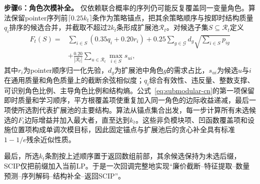 \documentclass[final,5p,times,twocolumn]{elsarticle}
\begin{document}
\noindent\textbf{步骤6：角色次模补全。} 仅依赖联合概率的序列仍可能反复覆盖同一变量角色。算法保留pointer序列前$\lceil0.25k_t\rceil$条作为策略锚点，把其余策略顺序与按即时结构质量$q_i$排序的候选合并，并截取不超过$2k_t$条形成扩展池$\mathcal R_t$。对候选子集$S\subseteq\mathcal R_t$定义
\begin{equation}
\begin{aligned}
F_t(S)={}&\sum_{i\in S}(0.35q_i+0.20r_i)
+0.25\sum_{g\in\mathcal G}d_g\sqrt{\sum_{i\in S}p_{ig}}\\
&+\frac{0.20}{|\mathcal R_t|}\sum_{u\in\mathcal R_t}\max_{i\in S}s_{ui},
\end{aligned}
\label{eq:submodular-cn}
\end{equation}
其中$r_i$为pointer顺序归一化先验，$d_g$为扩展池中角色$g$的需求占比，$s_{ui}$为候选$u$与$i$在通用质量和角色质量上的截断余弦相似度；$q_i$综合有效性、违反量、整数支撑、可识别角色比例、主导角色比例和结构熵。公式~\eqref{eq:submodular-cn}的第一项保留即时质量和学习顺序，平方根覆盖项使重复加入同一角色的边际收益递减，最后一项使所选割代表扩展池的主要结构。算法从锚点集合出发，每一步计算所有未选候选的$F_t$边际增益并加入最大者，直至达到$k_t$。这些非负模块项、凹函数覆盖项和设施位置项构成单调次模目标，因此固定锚点与扩展池后的贪心补全具有标准$1-1/e$残余近似性质\citep{nemhauser1978analysis}。

最后，所选$k_t$条割按上述顺序置于返回数组前部，其余候选保持为未选后缀，SCIP仅把前缀加入当前LP。于是一次回调完整地实现“廉价截断--特征提取--数量预测--序列解码--结构补全--返回SCIP”。
\end{document}
